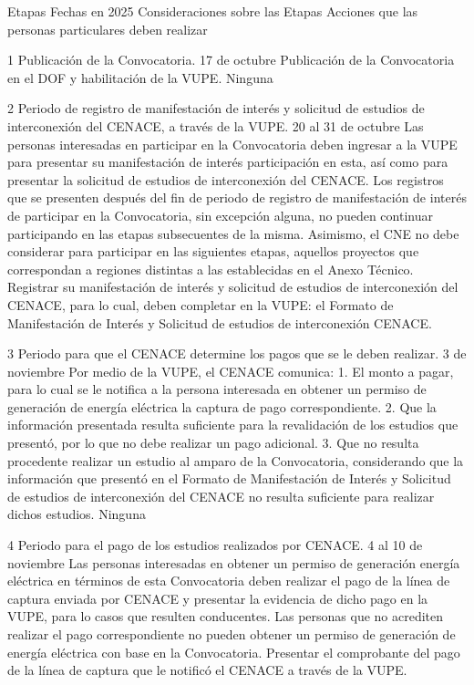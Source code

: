  Etapas
 Fechas en 2025
 Consideraciones sobre las Etapas
 Acciones que las personas particulares deben realizar
 
 1
 Publicación de la Convocatoria.
 17 de octubre
 Publicación de la Convocatoria en el DOF y habilitación de la VUPE.
 Ninguna
 
 2
 Periodo de registro de manifestación de interés y solicitud de estudios de interconexión del CENACE, a través de la VUPE.
 20 al 31 de octubre
 Las personas interesadas en participar en la Convocatoria deben ingresar a la VUPE para presentar su manifestación de interés participación en esta, así como para presentar la solicitud de estudios de interconexión del CENACE.
Los registros que se presenten después del fin de periodo de registro de manifestación de interés de participar en la Convocatoria, sin excepción alguna, no pueden continuar participando en las etapas subsecuentes de la misma.
Asimismo, el CNE no debe considerar para participar en las siguientes etapas, aquellos proyectos que correspondan a regiones distintas a las establecidas en el Anexo Técnico.
 Registrar su manifestación de interés y solicitud de estudios de interconexión del CENACE, para lo cual, deben completar en la VUPE: el Formato de Manifestación de Interés y Solicitud de estudios de interconexión CENACE.
 
 3
 Periodo para que el CENACE determine los pagos que se le deben realizar.
 3 de noviembre
 Por medio de la VUPE, el CENACE comunica:
1. El monto a pagar, para lo cual se le notifica a la persona interesada en obtener un permiso de generación de energía eléctrica la captura de pago correspondiente.
2. Que la información presentada resulta suficiente para la revalidación de los estudios que presentó, por lo que no debe realizar un pago adicional.
3. Que no resulta procedente realizar un estudio al amparo de la Convocatoria, considerando que la información que presentó en el Formato de Manifestación de Interés y Solicitud de estudios de interconexión del CENACE no resulta suficiente para realizar dichos estudios.
 Ninguna
 
 4
 Periodo para el pago de los estudios realizados por CENACE.
 4 al 10 de noviembre
 Las personas interesadas en obtener un permiso de generación energía eléctrica en términos de esta Convocatoria deben realizar el pago de la línea de captura enviada por CENACE y presentar la evidencia de dicho pago en la VUPE, para lo casos que resulten conducentes.
Las personas que no acrediten realizar el pago correspondiente no pueden obtener un permiso de generación de energía eléctrica con base en la Convocatoria.
 Presentar el comprobante del pago de la línea de captura que le notificó el CENACE a través de la VUPE.
 
